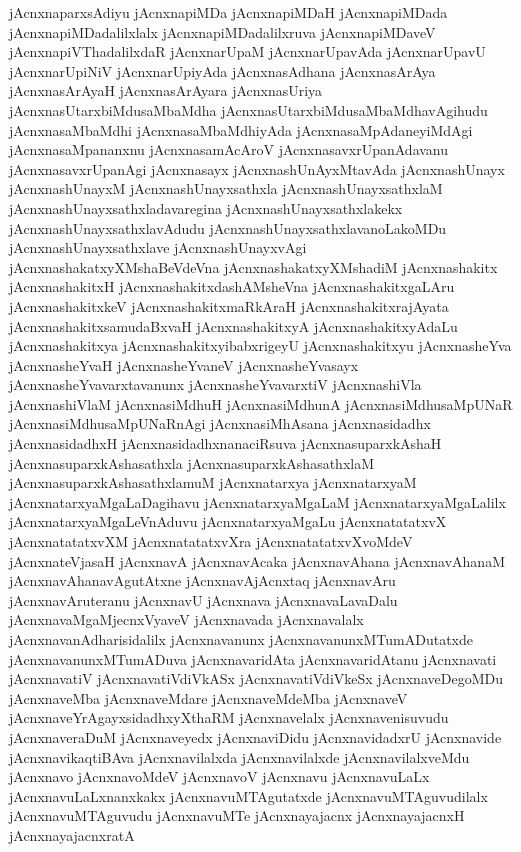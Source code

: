 {jAcnxnaparxsAdiyu
jAcnxnapiMDa
jAcnxnapiMDaH
jAcnxnapiMDada
jAcnxnapiMDadalilxlalx
jAcnxnapiMDadalilxruva
jAcnxnapiMDaveV
jAcnxnapiVThadalilxdaR
jAcnxnarUpaM
jAcnxnarUpavAda
jAcnxnarUpavU
jAcnxnarUpiNiV
jAcnxnarUpiyAda
jAcnxnasAdhana
jAcnxnasArAya
jAcnxnasArAyaH
jAcnxnasArAyara
jAcnxnasUriya
jAcnxnasUtarxbiMdusaMbaMdha
jAcnxnasUtarxbiMdusaMbaMdhavAgihudu
jAcnxnasaMbaMdhi
jAcnxnasaMbaMdhiyAda
jAcnxnasaMpAdaneyiMdAgi
jAcnxnasaMpananxnu
jAcnxnasamAcAroV
jAcnxnasavxrUpanAdavanu
jAcnxnasavxrUpanAgi
jAcnxnasayx
jAcnxnashUnAyxMtavAda
jAcnxnashUnayx
jAcnxnashUnayxM
jAcnxnashUnayxsathxla
jAcnxnashUnayxsathxlaM
jAcnxnashUnayxsathxladavaregina
jAcnxnashUnayxsathxlakekx
jAcnxnashUnayxsathxlavAdudu
jAcnxnashUnayxsathxlavanoLakoMDu
jAcnxnashUnayxsathxlave
jAcnxnashUnayxvAgi
jAcnxnashakatxyXMshaBeVdeVna
jAcnxnashakatxyXMshadiM
jAcnxnashakitx
jAcnxnashakitxH
jAcnxnashakitxdashAMsheVna
jAcnxnashakitxgaLAru
jAcnxnashakitxkeV
jAcnxnashakitxmaRkAraH
jAcnxnashakitxrajAyata
jAcnxnashakitxsamudaBxvaH
jAcnxnashakitxyA
jAcnxnashakitxyAdaLu
jAcnxnashakitxya
jAcnxnashakitxyibabxrigeyU
jAcnxnashakitxyu
jAcnxnasheYva
jAcnxnasheYvaH
jAcnxnasheYvaneV
jAcnxnasheYvasayx
jAcnxnasheYvavarxtavanunx
jAcnxnasheYvavarxtiV
jAcnxnashiVla
jAcnxnashiVlaM
jAcnxnasiMdhuH
jAcnxnasiMdhunA
jAcnxnasiMdhusaMpUNaR
jAcnxnasiMdhusaMpUNaRnAgi
jAcnxnasiMhAsana
jAcnxnasidadhx
jAcnxnasidadhxH
jAcnxnasidadhxnanaciRsuva
jAcnxnasuparxkAshaH
jAcnxnasuparxkAshasathxla
jAcnxnasuparxkAshasathxlaM
jAcnxnasuparxkAshasathxlamuM
jAcnxnatarxya
jAcnxnatarxyaM
jAcnxnatarxyaMgaLaDagihavu
jAcnxnatarxyaMgaLaM
jAcnxnatarxyaMgaLalilx
jAcnxnatarxyaMgaLeVnAduvu
jAcnxnatarxyaMgaLu
jAcnxnatatatxvX
jAcnxnatatatxvXM
jAcnxnatatatxvXra
jAcnxnatatatxvXvoMdeV
jAcnxnateVjasaH
jAcnxnavA
jAcnxnavAcaka
jAcnxnavAhana
jAcnxnavAhanaM
jAcnxnavAhanavAgutAtxne
jAcnxnavAjAcnxtaq
jAcnxnavAru
jAcnxnavAruteranu
jAcnxnavU
jAcnxnava
jAcnxnavaLavaDalu
jAcnxnavaMgaMjecnxVyaveV
jAcnxnavada
jAcnxnavalalx
jAcnxnavanAdharisidalilx
jAcnxnavanunx
jAcnxnavanunxMTumADutatxde
jAcnxnavanunxMTumADuva
jAcnxnavaridAta
jAcnxnavaridAtanu
jAcnxnavati
jAcnxnavatiV
jAcnxnavatiVdiVkASx
jAcnxnavatiVdiVkeSx
jAcnxnaveDegoMDu
jAcnxnaveMba
jAcnxnaveMdare
jAcnxnaveMdeMba
jAcnxnaveV
jAcnxnaveYrAgayxsidadhxyXthaRM
jAcnxnavelalx
jAcnxnavenisuvudu
jAcnxnaveraDuM
jAcnxnaveyedx
jAcnxnaviDidu
jAcnxnavidadxrU
jAcnxnavide
jAcnxnavikaqtiBAva
jAcnxnavilalxda
jAcnxnavilalxde
jAcnxnavilalxveMdu
jAcnxnavo
jAcnxnavoMdeV
jAcnxnavoV
jAcnxnavu
jAcnxnavuLaLx
jAcnxnavuLaLxnanxkakx
jAcnxnavuMTAgutatxde
jAcnxnavuMTAguvudilalx
jAcnxnavuMTAguvudu
jAcnxnavuMTe
jAcnxnayajacnx
jAcnxnayajacnxH
jAcnxnayajacnxratA
}
